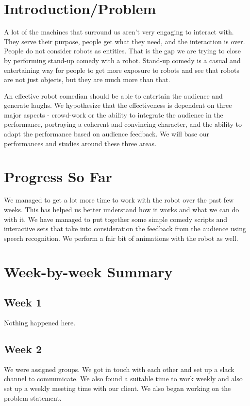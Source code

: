 \documentclass[onecolumn, draftclsnofoot,10pt, compsoc]{IEEEtran}
\begin{document}
\section{Introduction/Problem}
A lot of the machines that surround us aren't very engaging to interact with. They serve their purpose, people get what they need, and the interaction is over. People do not consider robots as entities. That is the gap we are trying to close by performing stand-up comedy with a robot. Stand-up comedy is a casual and entertaining way for people to get more exposure to robots and see that robots are not just objects, but they are much more than that.

An effective robot comedian should be able to entertain the audience and generate laughs. We hypothesize that the effectiveness is dependent on three major aspects - crowd-work or the ability to integrate the audience in the performance, portraying a coherent and convincing character, and the ability to adapt the performance based on audience feedback. We will base our performances and studies around these three areas.

\section{Progress So Far}
We managed to get a lot more time to work with the robot over the past few weeks. This has helped us better understand how it works and what we can do with it.
We have managed to put together some simple comedy scripts and interactive sets that take into consideration the feedback from the audience using speech recognition. We perform a fair bit of animations with the robot as well.

\section{Week-by-week Summary}


\subsection{Week 1}
Nothing happened here.
\subsection{Week 2}
We were assigned groups. We got in touch with each other and set up a slack channel to communicate. We also found a suitable time to work weekly and also set up a weekly meeting time with our client. We also began working on the problem statement.
\end{document}
